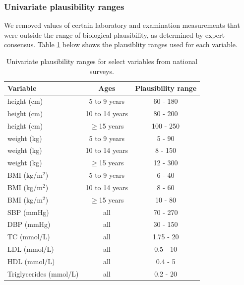 \documentclass[12pt]{article}
\begin{document}
\begin{appendix}
    \subsubsection{Univariate plausibility ranges}
    We removed values of certain laboratory and examination measurements that were outside the range of biological plausibility, as determined by expert consensus. Table \ref{tab:plausibility} below shows the plausiblity ranges used for each variable.

    \begin{table}[H]
        \centering
        \caption{Univariate plausibility ranges for select variables from national surveys.}
        \begin{tabular}{lcc}
            \hline
            Variable & Ages & Plausibility range \\
            \hline
            height (cm) & 5 to 9 years & 60 - 180 \\
            height (cm) & 10 to 14 years & 80 - 200 \\
            height (cm) & $\geq$15 years & 100 - 250 \\
            weight (kg) & 5 to 9 years & 5 - 90 \\
            weight (kg) & 10 to 14 years & 8 - 150 \\
            weight (kg) & $\geq$15 years & 12 - 300 \\
            BMI (kg/m$^2$) & 5 to 9 years & 6 - 40 \\
            BMI (kg/m$^2$) & 10 to 14 years & 8 - 60 \\
            BMI (kg/m$^2$) & $\geq$15 years & 10 - 80 \\
            SBP (mmHg) & all & 70 - 270 \\
            DBP (mmHg) & all & 30 - 150 \\
            TC (mmol/L) & all & 1.75 - 20 \\
            LDL (mmol/L) & all & 0.5 - 10 \\
            HDL (mmol/L) & all & 0.4 - 5 \\
            Triglycerides (mmol/L) & all & 0.2 - 20 \\
            \hline
        \end{tabular}
        \label{tab:plausibility}
    \end{table}


\end{appendix}
\end{document}

